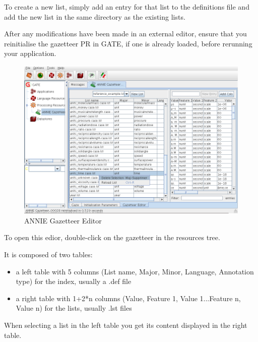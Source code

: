 To create a new list, simply add an entry for that list to the
definitions file and add the new list in the same directory as the
existing lists. 

After any modifications have been made in an external editor, ensure that
you reinitialise the gazetteer PR in GATE, if one is already loaded, before
rerunning your application.


\begin{figure}[htbp]
\begin{center}
\includegraphics[scale=0.5]{annie-gazetteer-editor.png}
\end{center}
\caption{ANNIE Gazetteer Editor}
\label{fig:anniegazeditor}
\end{figure}

To open this edior, double-click on the
gazetteer in the resources tree.

It is composed of two tables:
\begin{itemize}
\item a left table with 5 columns (List name, Major, Minor, Language, Annotation type) for the
  index, usually a .def file
\item a right table with 1+2*n columns (Value, Feature 1, Value 1...Feature
n, Value n) for the lists, usually .lst files
\end{itemize}

When selecting a list in the left table you get its content displayed in the
right table.

